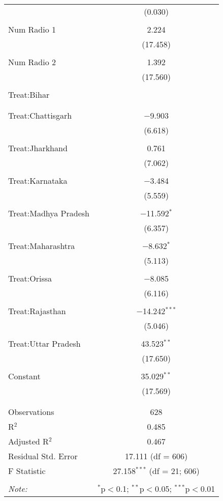 \begin{table}[!htbp]
\begin{tabular}{@{\extracolsep{5pt}}lc}
  & (0.030) \\ 
  & \\ 
 Num Radio 1 & 2.224 \\ 
  & (17.458) \\ 
  & \\ 
 Num Radio 2 & 1.392 \\ 
  & (17.560) \\ 
  & \\ 
 Treat:Bihar &  \\ 
  &  \\ 
  & \\ 
 Treat:Chattisgarh & $-$9.903 \\ 
  & (6.618) \\ 
  & \\ 
 Treat:Jharkhand & 0.761 \\ 
  & (7.062) \\ 
  & \\ 
 Treat:Karnataka & $-$3.484 \\ 
  & (5.559) \\ 
  & \\ 
 Treat:Madhya Pradesh & $-$11.592$^{*}$ \\ 
  & (6.357) \\ 
  & \\ 
 Treat:Maharashtra & $-$8.632$^{*}$ \\ 
  & (5.113) \\ 
  & \\ 
 Treat:Orissa & $-$8.085 \\ 
  & (6.116) \\ 
  & \\ 
 Treat:Rajasthan & $-$14.242$^{***}$ \\ 
  & (5.046) \\ 
  & \\ 
 Treat:Uttar Pradesh & 43.523$^{**}$ \\ 
  & (17.650) \\ 
  & \\ 
 Constant & 35.029$^{**}$ \\ 
  & (17.569) \\ 
  & \\ 
\hline \\[-1.8ex] 
Observations & 628 \\ 
R$^{2}$ & 0.485 \\ 
Adjusted R$^{2}$ & 0.467 \\ 
Residual Std. Error & 17.111 (df = 606) \\ 
F Statistic & 27.158$^{***}$ (df = 21; 606) \\ 
\hline 
\hline \\[-1.8ex] 
\textit{Note:}  & \multicolumn{1}{r}{$^{*}$p$<$0.1; $^{**}$p$<$0.05; $^{***}$p$<$0.01} \\ 
\end{tabular} 
\end{table} 
